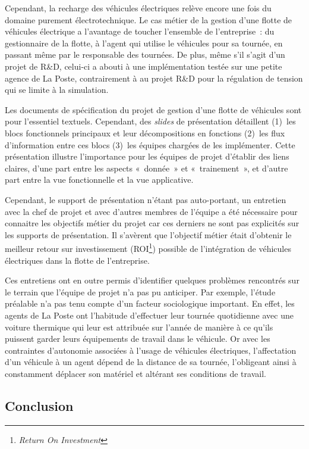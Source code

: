 Cependant, la recharge des véhicules électriques relève encore une fois du
domaine purement électrotechnique. Le cas métier de la gestion d'une flotte de
véhicules électrique a l'avantage de toucher l'ensemble de l'entreprise~: du
gestionnaire de la flotte, à l'agent qui utilise le véhicules pour sa tournée,
en passant même par le responsable des tournées. De plus, même s'il s'agit d'un
projet de R\&D, celui-ci a abouti à une implémentation testée sur une petite
agence de La Poste, contrairement à au projet R\&D pour la régulation de
tension qui se limite à la simulation.

Les documents de spécification du projet de gestion d'une flotte de véhicules
sont pour l'essentiel textuels. Cependant, des \textit{slides} de présentation
détaillent (1)~les blocs fonctionnels principaux et leur décompositions en
fonctions (2)~les flux d'information entre ces blocs (3)~les équipes chargées
de les implémenter. Cette présentation illustre l'importance pour les équipes
de projet d'établir des liens claires, d'une part entre les aspects «~donnée~»
et «~trainement~», et d'autre part entre la vue fonctionnelle et la vue
applicative.

Cependant, le support de présentation n'étant pas auto-portant, un entretien
avec la chef de projet et avec d'autres membres de l'équipe a été nécessaire
pour connaitre les objectifs métier du projet car ces derniers ne sont pas
explicités sur les supports de présentation. Il s'avèrent que l'objectif métier
était d'obtenir le meilleur retour sur investissement
(ROI\footnote{\textit{Return On Investment}}) possible de l'intégration de
véhicules électriques dans la flotte de l'entreprise.

Ces entretiens ont en outre permis d'identifier quelques problèmes rencontrés
sur le terrain que l'équipe de projet n'a pas pu anticiper. Par exemple, l'étude
préalable n'a pas tenu compte d'un facteur sociologique important. En effet,
les agents de La Poste ont l'habitude d'effectuer leur tournée quotidienne avec
une voiture thermique qui leur est attribuée sur l'année de manière à ce qu'ils
puissent garder leurs équipements de travail dans le véhicule. Or avec les
contraintes d'autonomie associées à l'usage de véhicules électriques,
l'affectation d'un véhicule à un agent dépend de la distance de sa tournée,
l'obligeant ainsi à constamment déplacer son matériel et altérant ses
conditions de travail.

	\subsection{Conclusion}

